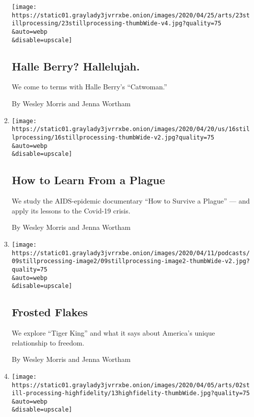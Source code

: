 \begin{enumerate}
  \texttt{[image: https://static01.graylady3jvrrxbe.onion/images/2020/04/25/arts/23stillprocessing/23stillprocessing-thumbWide-v4.jpg?quality=75\\\&auto=webp\\\&disable=upscale]}

  \hypertarget{halle-berry-hallelujah}{%
  \subsection{Halle Berry? Hallelujah.}\label{halle-berry-hallelujah}}

  We come to terms with Halle Berry's ``Catwoman.''

  By Wesley Morris and Jenna Wortham
\item
  \href{/2020/04/16/podcasts/still-processing-AIDS-survive-coronavirus.html}{}

  \texttt{[image: https://static01.graylady3jvrrxbe.onion/images/2020/04/20/us/16stillprocessing/16stillprocessing-thumbWide-v2.jpg?quality=75\\\&auto=webp\\\&disable=upscale]}

  \hypertarget{how-to-learn-from-a-plague}{%
  \subsection{How to Learn From a
  Plague}\label{how-to-learn-from-a-plague}}

  We study the AIDS-epidemic documentary ``How to Survive a Plague'' ---
  and apply its lessons to the Covid-19 crisis.

  By Wesley Morris and Jenna Wortham
\item
  \href{/2020/04/09/podcasts/still-processing-tiger-king.html}{}

  \texttt{[image: https://static01.graylady3jvrrxbe.onion/images/2020/04/11/podcasts/09stillprocessing-image2/09stillprocessing-image2-thumbWide-v2.jpg?quality=75\\\&auto=webp\\\&disable=upscale]}

  \hypertarget{frosted-flakes}{%
  \subsection{Frosted Flakes}\label{frosted-flakes}}

  We explore ``Tiger King'' and what it says about America's unique
  relationship to freedom.

  By Wesley Morris and Jenna Wortham
\item
  \href{/2020/04/02/podcasts/high-fidelity-zoe-kravitz.html}{}

  \texttt{[image: https://static01.graylady3jvrrxbe.onion/images/2020/04/05/arts/02still-processing-highfidelity/13highfidelity-thumbWide.jpg?quality=75\\\&auto=webp\\\&disable=upscale]}


\end{enumerate}
